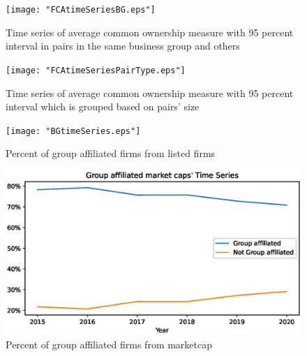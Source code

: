 \documentclass[12pt, a4paper]{article}
\begin{document}
			\begin{figure}
	\centering  
	\caption{Time series of average common ownership measure with 95 percent interval in pairs in the same business group and others}
	\texttt{[image: "FCAtimeSeriesBG.eps"]}
\end{figure}    

\begin{figure}
	\centering  
	\caption{Time series of average common ownership measure with 95 percent interval which is grouped based on pairs' size}
	\texttt{[image: "FCAtimeSeriesPairType.eps"]}
\end{figure}




	\begin{figure}
	\centering  
	\caption{Percent of group affiliated firms from listed firms}
	\texttt{[image: "BGtimeSeries.eps"]}
	
\end{figure}  

\begin{figure}
	\centering  
	\caption{Percent of group affiliated firms from marketcap}
	\includegraphics[width=\linewidth]{"BGMarketCaptimeSeries.eps"}
	
\end{figure}
 
%
\end{document}
